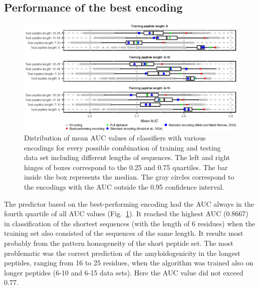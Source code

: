 \documentclass[fleqn,10pt,twoside]{gcb15submission}
\begin{document}
\subsection{Performance of the best encoding}

\begin{figure}[!tpb]
\centerline{\includegraphics{figures/AUC_boxplot.eps}}
\caption{Distribution of mean AUC values of classifiers with various encodings 
for every possible combination of training and testing data set including 
different lengths of sequences. The left and right hinges of boxes correspond to 
the 0.25 and 0.75 quartiles. The bar inside the box represents the median. The 
gray circles correspond to the encodings with the AUC outside the 0.95 
confidence interval. 
}\label{fig:AUC_boxplot} %
%
%
%
%
%


\end{figure}

The predictor based on the best-performing encoding had the AUC always in the fourth 
quartile of all AUC values (Fig.~\ref{fig:AUC_boxplot}). It reached the highest AUC (0.8667) 
in classification of the shortest sequences (with the length of 6 residues) when 
the training set also consisted of the sequences of the same length. It results most 
probably from the pattern homogeneity of the short peptide set. The most problematic was the 
correct prediction of the amyloidogenicity in the longest peptides, ranging from 16 to 25 
residues, when the algorithm was trained also on longer peptides (6-10 and 6-15 
data sets). Here the AUC value did not exceed 0.77.
\end{document}
